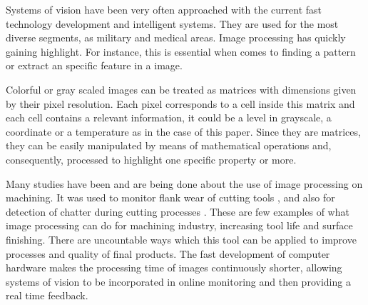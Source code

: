 Systems of vision have been very often approached with the current fast technology development and intelligent systems. They are used for the most diverse segments, as military and medical areas. Image processing has quickly gaining highlight. For instance, this is essential when comes to finding a pattern or extract an specific feature in a image. 

Colorful or gray scaled images can be treated as matrices with dimensions given by their pixel resolution. Each pixel corresponds to a cell inside this matrix and each cell contains a relevant information, it could be a level in grayscale, a coordinate or a temperature as in the case of this paper. Since they are matrices, they can be easily manipulated by means of mathematical operations and, consequently, processed to highlight one specific property or more.

Many studies have been and are being done about the use of image processing on machining. It was used to monitor flank wear of cutting tools \cite{jeon1988optical}, \cite{kurada1997machine} and also for detection of chatter during cutting processes \cite{khalifa2006image}. These are few examples of what image processing can do for machining industry, increasing tool life and surface finishing. There are uncountable ways which this tool can be applied to improve processes and quality of final products. The fast development of computer hardware makes the processing time of images continuously shorter, allowing systems of vision to be incorporated in online monitoring and then providing a real time feedback.